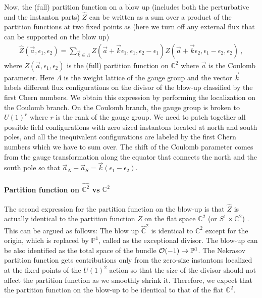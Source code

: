 \documentclass[letterpaper, 11pt]{article}
\def\IC{\mathbb{C}}
\def\IP{\mathbb{P}}
\def\CO{{\cal O}}
\def\e{\epsilon}
\begin{document}
Now, the (full) partition function on a blow up (includes both the perturbative and the instanton parts) $\hat{Z}$ can be written as a sum over a product of the partition functions at two fixed points as (here we turn off any external flux that can be supported on the blow up) \cite{Nekrasov:2003vi, Gottsche:2006bm, Gottsche:2006tn, Gasparim:2008ri, Bonelli:2012ny}
\begin{align} \label{eq:blowup}
 \hat{Z}(\vec{a}, \e_1, \e_2) = \sum_{\vec{k} \in \Lambda} Z(\vec{a}+ \vec{k} \e_1, \e_1, \e_2 - \e_1) Z(\vec{a}+\vec{k} \e_2, \e_1 - \e_2, \e_2) \ , 
\end{align}
where $Z(\vec{a}, \e_1, \e_2)$ is the (full) partition function on $\IC^2$ where $\vec{a}$ is the Coulomb parameter. 
Here $\Lambda$ is the weight lattice of the gauge group and the vector $\vec{k}$ labels different flux configurations on the divisor of the blow-up classified by the first Chern numbers. 
We obtain this expression by performing the localization on the Coulomb branch. On the Coulomb branch, the gauge group is broken to $U(1)^r$ where $r$ is the rank of the gauge group. We need to patch together all possible field configurations with zero sized instantons located at north and south poles, and all the inequivalent configurations are labeled by the first Chern numbers which we have to sum over. The shift of the Coulomb parameter comes from the gauge transformation along the equator that connects the north and the south pole so that $\vec{a}_N - \vec{a}_S = \vec{k} (\e_1 - \e_2)$. 

\paragraph{Partition function on $\hat{\IC^2}$ vs $\IC^2$}
The second expression for the partition function on the blow-up is that $\hat{Z}$ is actually identical to the partition function $Z$ on the flat space $\IC^2$ (or $S^1 \times \IC^2$) \cite{Nakajima:2003pg, Nakajima:2003uh,Nakajima:2005fg}. This can be argued as follows: The blow up $\hat{\IC}^2$ is identical to $\IC^2$ except for the origin, which is replaced by $\IP^1$, called as the exceptional divisor. The blow-up can be also identified as the total space of the bundle $\CO(-1) \to \IP^1$. 
The Nekrasov partition function gets contributions only from the zero-size instantons localized at the fixed points of the $U(1)^2$ action so that the size of the divisor should not affect the partition function as we smoothly shrink it. Therefore, we expect that the partition function on the blow-up to be identical to that of the flat $\IC^2$.
\end{document}

